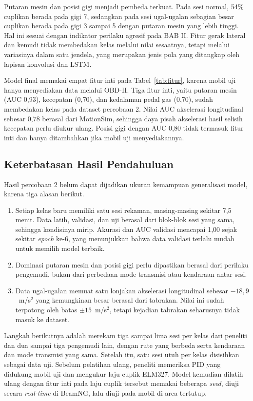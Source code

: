 Putaran mesin dan posisi gigi menjadi pembeda terkuat. Pada sesi normal, 54\% cuplikan berada pada gigi 7, sedangkan pada sesi ugal-ugalan sebagian besar cuplikan berada pada gigi 3 sampai 5 dengan putaran mesin yang lebih tinggi. Hal ini sesuai dengan indikator perilaku agresif pada BAB II. Fitur gerak lateral dan kemudi tidak membedakan kelas melalui nilai sesaatnya, tetapi melalui variasinya dalam satu jendela, yang merupakan jenis pola yang ditangkap oleh lapisan konvolusi dan LSTM.

Model final memakai empat fitur inti pada Tabel~\ref{tab:fitur}, karena mobil uji hanya menyediakan data melalui OBD-II. Tiga fitur inti, yaitu putaran mesin (AUC 0,93), kecepatan (0,70), dan kedalaman pedal gas (0,70), sudah membedakan kelas pada dataset percobaan 2. Nilai AUC akselerasi longitudinal sebesar 0,78 berasal dari MotionSim, sehingga daya pisah akselerasi hasil selisih kecepatan perlu diukur ulang. Posisi gigi dengan AUC 0,80 tidak termasuk fitur inti dan hanya ditambahkan jika mobil uji menyediakannya.

\subsection{Keterbatasan Hasil Pendahuluan}
Hasil percobaan 2 belum dapat dijadikan ukuran kemampuan generalisasi model, karena tiga alasan berikut.
\begin{enumerate}
  \item Setiap kelas baru memiliki satu sesi rekaman, masing-masing sekitar 7,5 menit. Data latih, validasi, dan uji berasal dari blok-blok sesi yang sama, sehingga kondisinya mirip. Akurasi dan AUC validasi mencapai 1,00 sejak sekitar \textit{epoch} ke-6, yang menunjukkan bahwa data validasi terlalu mudah untuk memilih model terbaik.
  \item Dominasi putaran mesin dan posisi gigi perlu dipastikan berasal dari perilaku pengemudi, bukan dari perbedaan mode transmisi atau kendaraan antar sesi.
  \item Data ugal-ugalan memuat satu lonjakan akselerasi longitudinal sebesar $-18{,}9$~m/s$^{2}$ yang kemungkinan besar berasal dari tabrakan. Nilai ini sudah terpotong oleh batas $\pm 15$~m/s$^{2}$, tetapi kejadian tabrakan seharusnya tidak masuk ke dataset.
\end{enumerate}

Langkah berikutnya adalah merekam tiga sampai lima sesi per kelas dari peneliti dan dua sampai tiga pengemudi lain, dengan rute yang berbeda serta kendaraan dan mode transmisi yang sama. Setelah itu, satu sesi utuh per kelas disisihkan sebagai data uji. Sebelum pelatihan ulang, peneliti memeriksa PID yang didukung mobil uji dan mengukur laju cuplik ELM327. Model kemudian dilatih ulang dengan fitur inti pada laju cuplik tersebut memakai beberapa \textit{seed}, diuji secara \textit{real-time} di BeamNG, lalu diuji pada mobil di area tertutup.
